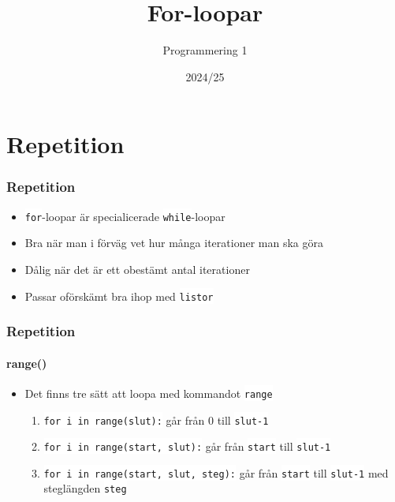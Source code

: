 \documentclass[aspectratio=169]{beamer}
\newcommand{\code}[1]{\colorbox{white}{\lstinline{#1}}}
\begin{document}


\title{For-loopar}
\date{2024/25}
\author{Programmering 1}

\maketitle

\section{Repetition}

\begin{frame}
	\frametitle{Repetition}
	
	\begin{itemize}
		\item \code{for}-loopar är specialicerade \code{while}-loopar
		\item Bra när man i förväg vet hur många iterationer man ska göra
		\item Dålig när det är ett obestämt antal iterationer
		\item Passar oförskämt bra ihop med \code{listor}
	\end{itemize}
	
\end{frame}

\begin{frame}[fragile]
	\frametitle{Repetition}
	\framesubtitle{range()}
	
	\begin{itemize}
		\item Det finns tre sätt att loopa med kommandot \code{range}
		\begin{enumerate}
			\item \code{for i in range(slut):} går från 0 till \code{slut-1}
			\item \code{for i in range(start, slut):} går från \code{start} till \code{slut-1}
			\item \code{for i in range(start, slut, steg):} går från \code{start} till \code{slut-1} med steglängden \code{steg} 
		\end{enumerate}
	\end{itemize}
	
\end{frame}
\end{document}
